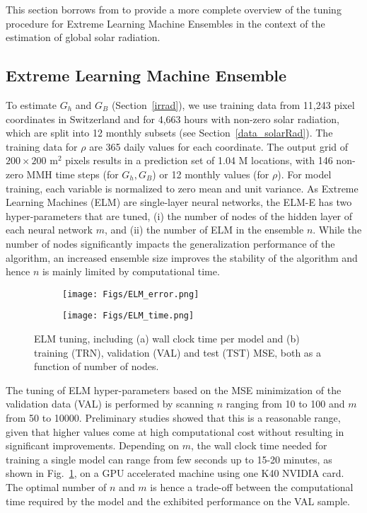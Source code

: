 This section borrows from \citet{walch_spatio-temporal_2019} to provide a more complete overview of the tuning procedure for Extreme Learning Machine Ensembles in the context of the estimation of global solar radiation.

\subsection*{Extreme Learning Machine Ensemble}
\label{app:tune_ELM}

To estimate $G_h$ and $G_B$ (Section~\ref{irrad}), we use training data from 11,243 pixel coordinates in Switzerland and for 4,663 hours with non-zero solar radiation, which are split into 12 monthly subsets (see Section~\ref{data_solarRad}).
The training data for $\rho$ are 365 daily values for each coordinate. 
The output grid of $200 \times 200$ m$^2$ pixels results in a prediction set of 1.04 M locations, with 146 non-zero MMH time steps (for $G_h, G_B$) or 12 monthly values (for $\rho$).  For model training, each variable is normalized to zero mean and unit variance.
%
As Extreme Learning Machines (ELM) are single-layer neural networks, the ELM-E has two hyper-parameters that are tuned, (i) the number of nodes of the hidden layer of each neural network $m$, and (ii) the number of ELM in the ensemble $n$. While the number of nodes significantly impacts the generalization performance of the algorithm, an increased ensemble size improves the stability of the algorithm and hence $n$ is mainly limited by computational time. %

\begin{figure}[tb]
\centering
\begin{subfigure}{.49\textwidth}
  \centering
  \texttt{[image: Figs/ELM\_error.png]}  
  \caption{}
  \label{figa:ELM_training}
\end{subfigure}
\begin{subfigure}{.49\textwidth}
  \centering
  \texttt{[image: Figs/ELM\_time.png]}  
  \caption{}
  \label{figb:ELM_training}
\end{subfigure}
\caption{ELM tuning, including (a) wall clock time per model and (b) training (TRN), validation (VAL) and test (TST) MSE, both as a function of number of nodes.}
\label{fig:ELM_training}
\end{figure}

The tuning of ELM hyper-parameters based on the MSE minimization of the validation data (VAL) is performed by scanning $n$ ranging from 10 to 100 and $m$ from 50 to 10000. Preliminary studies showed that this is a reasonable range, given that higher values come at high computational cost without resulting in significant improvements. Depending on $m$, the wall clock time needed for training a single model can range from few seconds up to 15-20 minutes, as shown in Fig.~\ref{figa:ELM_training}, on a GPU accelerated machine using one K40 NVIDIA card. The optimal number of $n$ and $m$ is hence a trade-off between the computational time required by the model and the exhibited performance on the VAL sample.

